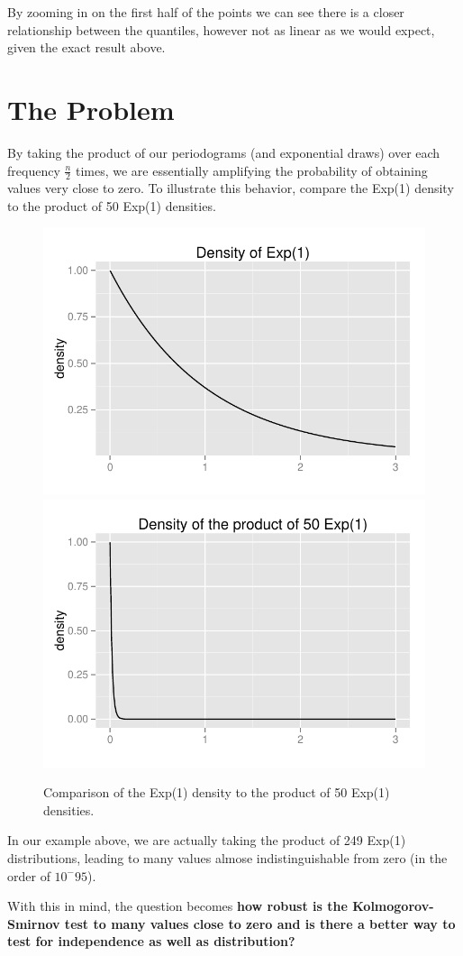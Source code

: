 \documentclass{article}\usepackage[]{graphicx}\usepackage[]{color}
\newenvironment{knitrout}{}{} %
\theoremstyle{plain}
\begin{document}
By zooming in on the first half of the points we can see there is a closer relationship between the quantiles, however not as linear as we would expect, given the exact result above. 

\section*{The Problem}
By taking the product of our periodograms (and exponential draws) over each frequency $\frac{n}{2}$ times, we are essentially amplifying the probability of obtaining values very close to zero. To illustrate this behavior, compare the Exp(1) density to the product of 50 Exp(1) densities.
\begin{knitrout}
\color{fgcolor}\begin{figure}[H]

\includegraphics[width=.49\textwidth]{figure/density1} 
\includegraphics[width=.49\textwidth]{figure/density2} \caption[Comparison of the Exp(1) density to the product of 50 Exp(1) densities]{Comparison of the Exp(1) density to the product of 50 Exp(1) densities.\label{fig:density}}
\end{figure}


\end{knitrout}

In our example above, we are actually taking the product of 249 Exp(1) distributions, leading to many values almose indistinguishable from zero (in the order of $10^-95$).

With this in mind, the question becomes {\bf how robust is the Kolmogorov-Smirnov test to many values close to zero and is there a better way to test for independence as well as distribution?}
\end{document}
